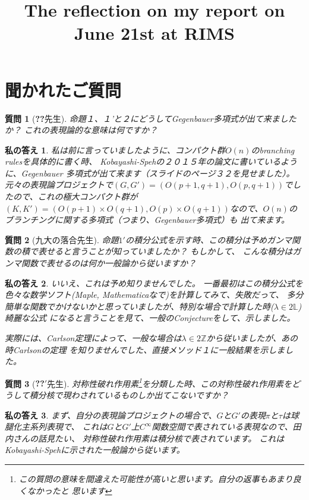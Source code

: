 \documentclass[12pt]{article} %
\title{The reflection on my report on June 21st at RIMS}
\author{}
\date{} %
\newtheorem{question}{質問}
\newtheorem{answer}{私の答え}
\begin{document}
\maketitle
\section{聞かれたご質問}
\begin{question}[\textbf{??}先生]
	命題１、１’と２にどうしてGegenbauer多項式が出て来ましたか？
	これの表現論的な意味は何ですか？
\end{question}
\begin{answer}
私は前に言っていましたように、コンパクト群$O(n)$のbranching rulesを具体的に書く時、
Kobayashi-Spehの２０１５年の論文に書いているように、Gegenbauer 多項式が出て来ます{\small （スライドのページ３２を見せました）}。
元々の表現論プロジェクトで$(G,G')=(O(p+1,q+1),O(p,q+1))$でしたので、これの極大コンパクト群が
$(K,K')=(O(p+1)\times O(q+1),O(p)\times O(q+1))$なので、$O(n)$のブランチングに関する多項式（つまり、Gegenbauer多項式）も
出て来ます。
\end{answer}
\begin{question}[九大の落合先生]
	命題$1'$の積分公式を示す時、この積分は予めガンマ関数の積で表せると言うことが知っていましたか？
	もしかして、
	こんな積分はガンマ関数で表せるのは何か一般論から従いますか？
\end{question}
\begin{answer}
いいえ、これは予め知りませんでした。
一番最初はこの積分公式を色々な数学ソフト(Maple, Mathematicaなで)を計算してみて、失敗だって、
多分簡単な関数でかけないかと思っていましたが、特別な場合で計算した時($\lambda\in2\mathbb{L}$)綺麗な公式
になると言うことを見て、一般のConjectureをして、示しました。

実際には、Carlson定理によって、一般な場合は$\lambda\in 2\mathbb{Z}$から従いましたが、あの時Carlsonの定理
を知りませんでした、直接メソッド１に一般結果を示しました。
\end{answer}
\begin{question}[\textbf{??$'$}先生]
	対称性破れ作用素\footnote{この質問の意味を間違えた可能性が高いと思います。自分の返事もあまり良くなかったと
	思います}を分類した時、この対称性破れ作用素をどうして積分核で現わされているものしか出てこないですか？
\end{question}
\begin{answer}
	まず、自分の表現論プロジェクトの場合で、$G$と$G'$の表現$\pi$と$\tau$は球腿化主系列表現で、
	これは$G$と$G'$上$C^\infty$関数空間で表されている表現なので、田内さんの話見たい、
	対称性破れ作用素は積分核で表されています。
	これはKobayashi-Spehに示された一般論から従います。
\end{answer}
\end{document}
